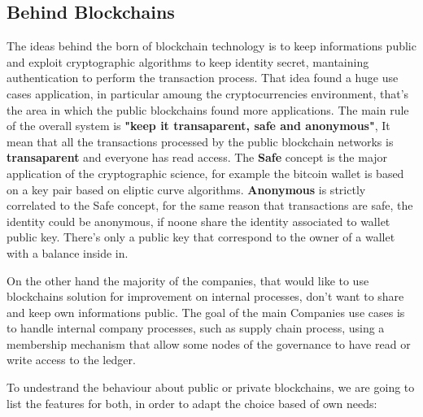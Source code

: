 \subsection{Behind Blockchains}
The ideas behind the born of blockchain technology is to keep informations public and exploit cryptographic
algorithms to keep identity secret, mantaining authentication to perform the transaction process. That 
idea found a huge use cases application, in particular amoung the cryptocurrencies environment, that's 
the area in which the public blockchains found more applications. The main rule of the overall system is 
\textbf{"keep it transaparent, safe and anonymous"}, It mean that all the transactions processed by the 
public blockchain networks is \textbf{transaparent} and everyone has read access. The \textbf{Safe}
concept is the major application of the cryptographic science, for example the bitcoin wallet is based
on a key pair based on eliptic curve algorithms. \textbf{Anonymous} is strictly correlated to the Safe
concept, for the same reason that transactions are safe, the identity could be anonymous, if noone share
the identity associated to wallet public key. There's only a public key that correspond to the owner 
of a wallet with a balance inside in. 
\bigskip

On the other hand the majority of the companies, that would like to use blockchains solution for 
improvement on internal processes, don't want to share and keep own informations public. The goal
of the main Companies use cases is to handle internal company processes, such as supply chain process,
using a membership mechanism that allow some nodes of the governance to have read or write access to the 
ledger. 

\bigskip
To undestrand the behaviour about public or private blockchains, we are going to list the features
for both, in order to adapt the choice based of own needs: 

